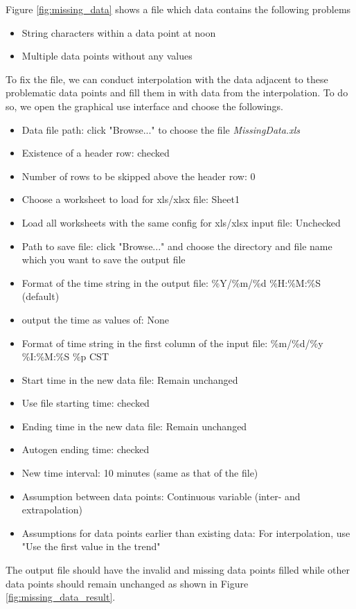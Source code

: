 \documentclass[12pt,a4paper]{article}
\begin{document}
Figure \ref{fig:missing_data} shows a file which data contains the following problems
\begin{itemize}
\item String characters within a data point at noon
\item Multiple data points without any values
\end{itemize}

To fix the file, we can conduct interpolation with the data adjacent to these problematic data points and fill them in with data from the interpolation.
To do so, we open the graphical use interface and choose the followings.
\begin{itemize}
\item Data file path: click "Browse..." to choose the file \emph{MissingData.xls}
\item Existence of a header row: checked
\item Number of rows to be skipped above the header row: 0
\item Choose a worksheet to load for xls/xlsx file: Sheet1
\item Load all worksheets with the same config for xls/xlsx input file: Unchecked
\item Path to save file: click "Browse..." and choose the directory and file name which you want to save the output file
\item Format of the time string in the output file: \%Y/\%m/\%d \%H:\%M:\%S (default)
\item output the time as values of: None
\item Format of time string in the first column of the input file: \%m/\%d/\%y \%I:\%M:\%S \%p CST
\item Start time in the new data file: Remain unchanged
\item Use file starting time: checked
\item Ending time in the new data file: Remain unchanged
\item Autogen ending time: checked
\item New time interval: 10 minutes (same as that of the file)
\item Assumption between data points: Continuous variable (inter- and extrapolation)
\item Assumptions for data points earlier than existing data: For interpolation, use "Use the first value in the trend"
\end{itemize}

The output file should have the invalid and missing data points filled while other data points should remain unchanged as shown in Figure \ref{fig:missing_data_result}.
\end{document}
